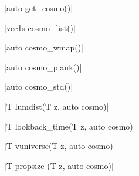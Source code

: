 \funcitem \cppinline|auto get_cosmo()| 

\cppinline|vec1s cosmo_list()| 

\cppinline|auto cosmo_wmap()| 

\cppinline|auto cosmo_plank()| 

\cppinline|auto cosmo_std()| 

\funcitem \vectorfunc \cppinline|T lumdist(T z, auto cosmo)| 

\funcitem \vectorfunc \cppinline|T lookback_time(T z, auto cosmo)| 

\funcitem \vectorfunc \cppinline|T vuniverse(T z, auto cosmo)| 

\funcitem \vectorfunc \cppinline|T propsize (T z, auto cosmo)| 
